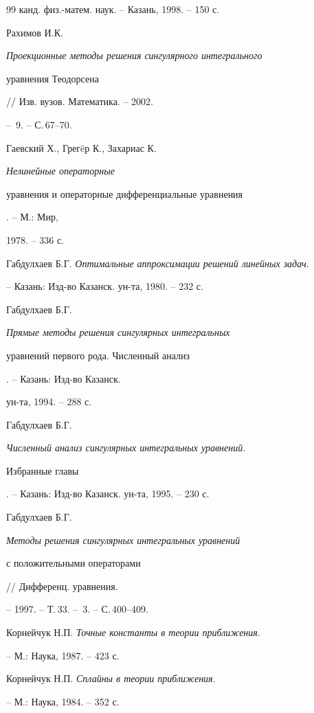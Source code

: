 \begin{thebibliography}{99}
канд. физ.-матем. наук. -- Казань, 1998. -- 150 с.




Рахимов И.К. {\em Проекционные методы решения сингулярного интегрального 


уравнения Теодорсена} // Изв. вузов. Математика. -- 2002.


-- \No\,9. -- С.\,67--70.




Гаевский Х., Грег\"eр К., Захариас К. {\em Нелинейные операторные 


уравнения и операторные дифференциальные уравнения}. -- М.: Мир,


1978. -- 336 с.




Габдулхаев Б.Г. {\em Оптимальные аппроксимации решений линейных задач}.


-- Казань: Изд-во Казанск. ун-та, 1980. -- 232 с.




Габдулхаев Б.Г. {\em Прямые методы решения сингулярных интегральных 


уравнений первого рода. Численный анализ}. -- Казань: Изд-во Казанск.


ун-та, 1994. -- 288 с.




Габдулхаев Б.Г. {\em Численный анализ сингулярных интегральных уравнений. 


Избранные главы}. -- Казань: Изд-во Казанск. ун-та, 1995. -- 230 с.




Габдулхаев Б.Г. {\em Методы решения сингулярных интегральных уравнений 


с положительными операторами} // Дифференц. уравнения.


-- 1997. -- Т.\,33. -- \No\,3. -- С.\,400--409.




Корнейчук Н.П. {\em Точные константы в теории приближения}.


-- М.: Наука, 1987. -- 423 с.




Корнейчук Н.П. {\em Сплайны в теории приближения}.


-- М.: Наука, 1984. -- 352 с.





\end{thebibliography}





\vskip 2cm














\label{end}





